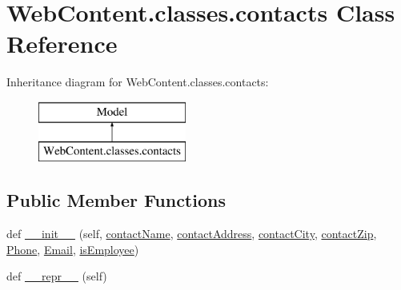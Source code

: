\hypertarget{class_web_content_1_1classes_1_1contacts}{}\section{Web\+Content.\+classes.\+contacts Class Reference}
\label{class_web_content_1_1classes_1_1contacts}
Inheritance diagram for Web\+Content.\+classes.\+contacts\+:\begin{figure}[H]
\begin{center}
\leavevmode
\includegraphics[height=2.000000cm]{class_web_content_1_1classes_1_1contacts}
\end{center}
\end{figure}
\subsection*{Public Member Functions}
\begin{DoxyCompactItemize}
\item 
def \hyperlink{class_web_content_1_1classes_1_1contacts_a867bb2313c6cc01e6d3fa6936257f70c}{\+\_\+\+\_\+init\+\_\+\+\_\+} (self, \hyperlink{class_web_content_1_1classes_1_1contacts_af5b7ebdde96128f644dba2c9003395e1}{contact\+Name}, \hyperlink{class_web_content_1_1classes_1_1contacts_aa2f4eaf4a9e2620d3f9cf92d359cb68e}{contact\+Address}, \hyperlink{class_web_content_1_1classes_1_1contacts_ab337e819e9708c4385d88e19e5b4272a}{contact\+City}, \hyperlink{class_web_content_1_1classes_1_1contacts_aff779f52e8d69185e09157ab38bbeef2}{contact\+Zip}, \hyperlink{class_web_content_1_1classes_1_1contacts_aa4c26f3a90e573a3d5495dd9fea09067}{Phone}, \hyperlink{class_web_content_1_1classes_1_1contacts_af308c0c25a34db25695da939142548da}{Email}, \hyperlink{class_web_content_1_1classes_1_1contacts_a6ef2db0009b3b8b0facfaf88d54b84e1}{is\+Employee})
\item 
def \hyperlink{class_web_content_1_1classes_1_1contacts_a7d04c296ef51af2cfc29faa3a8ee9e3a}{\+\_\+\+\_\+repr\+\_\+\+\_\+} (self)
\end{DoxyCompactItemize}

